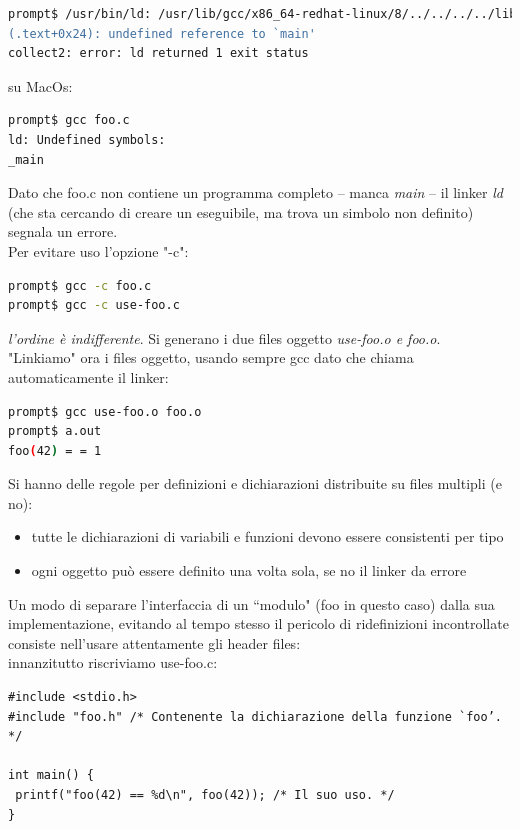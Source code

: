 \documentclass[a4paper,12pt, oneside]{book}
\begin{document}
\begin{shaded}
\begin{lstlisting}[language=bash]
prompt$ /usr/bin/ld: /usr/lib/gcc/x86_64-redhat-linux/8/../../../../lib64/crt1.o: in function `_start':
(.text+0x24): undefined reference to `main'
collect2: error: ld returned 1 exit status
\end{lstlisting}
\end{shaded}
su MacOs:
\begin{shaded}
\begin{lstlisting}[language=bash]
prompt$ gcc foo.c
ld: Undefined symbols:
_main
\end{lstlisting}
\end{shaded}
Dato che foo.c non contiene un programma completo – manca \textit{main} – il linker \textit{ld} (che sta cercando di creare un eseguibile, ma trova un simbolo non definito) segnala un errore.\\
Per evitare uso l'opzione "-c":
\begin{shaded}
\begin{lstlisting}[language=bash]
prompt$ gcc -c foo.c
prompt$ gcc -c use-foo.c
\end{lstlisting}
\end{shaded}
\textit{l'ordine è indifferente}. Si generano i due files oggetto \textit{use-foo.o e foo.o}. "Linkiamo" ora i files oggetto, usando sempre gcc dato che chiama automaticamente il linker:
\begin{shaded}
\begin{lstlisting}[language=bash]
prompt$ gcc use-foo.o foo.o
prompt$ a.out
foo(42) = = 1
\end{lstlisting}
\end{shaded}
Si hanno delle regole per definizioni e dichiarazioni distribuite su files multipli (e no):
\begin{itemize}
\item tutte le dichiarazioni di variabili e funzioni devono essere consistenti per tipo
\item ogni oggetto può essere definito una volta sola, se no il linker da errore
\end{itemize}
Un modo di separare l'interfaccia di un “modulo" (foo in questo caso) dalla sua implementazione, evitando al tempo stesso il pericolo di ridefinizioni incontrollate consiste nell’usare attentamente gli header files:\\
innanzitutto riscriviamo use-foo.c:
\begin{verbatim}
#include <stdio.h>
#include "foo.h" /* Contenente la dichiarazione della funzione `foo’. */

int main() {
 printf("foo(42) == %d\n", foo(42)); /* Il suo uso. */
}
\end{verbatim}
\end{document}
